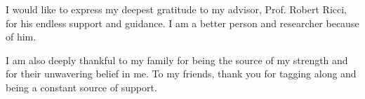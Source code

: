 I would like to express my deepest gratitude to my advisor, Prof. Robert Ricci,
for his endless support and guidance. I am a better person and researcher
because of him.

I am also deeply thankful to my family for being the source of my strength and
for their unwavering belief in me. To my friends, thank you for tagging along
and being a constant source of support.
